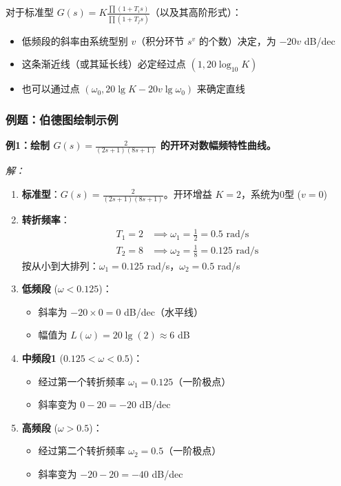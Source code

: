 对于标准型 $G(s) = K \frac{\prod(1+T_i s)}{\prod(1+T_j s)}$（以及其高阶形式）：
\begin{itemize}
    \item 低频段的斜率由系统型别 $v$（积分环节 $s^v$ 的个数）决定，为 $-20v$ dB/dec
    \item 这条渐近线（或其延长线）必定经过点 $(1, 20\log_{10}K)$
    \item 也可以通过点 $(\omega_0, 20\lg K - 20v\lg\omega_0)$ 来确定直线
\end{itemize}

\subsubsection{例题：伯德图绘制示例}

\textbf{例1：绘制 $G(s) = \frac{2}{(2s+1)(8s+1)}$ 的开环对数幅频特性曲线。}

\textit{解：}
\begin{enumerate}
    \item \textbf{标准型}：$G(s) = \frac{2}{(2s+1)(8s+1)}$。开环增益 $K=2$，系统为0型 ($v=0$)
    
    \item \textbf{转折频率}：
    \begin{align*}
    T_1=2 &\implies \omega_1=\frac{1}{2}=0.5 \text{ rad/s} \\
    T_2=8 &\implies \omega_2=\frac{1}{8}=0.125 \text{ rad/s}
    \end{align*}
    按从小到大排列：$\omega_1 = 0.125$ rad/s，$\omega_2 = 0.5$ rad/s
    
    \item \textbf{低频段} ($\omega < 0.125$)：
    \begin{itemize}
        \item 斜率为 $-20 \times 0 = 0$ dB/dec（水平线）
        \item 幅值为 $L(\omega) = 20\lg(2) \approx 6$ dB
    \end{itemize}
    
    \item \textbf{中频段1} ($0.125 < \omega < 0.5$)：
    \begin{itemize}
        \item 经过第一个转折频率 $\omega_1 = 0.125$（一阶极点）
        \item 斜率变为 $0 - 20 = -20$ dB/dec
    \end{itemize}
    
    \item \textbf{高频段} ($\omega > 0.5$)：
    \begin{itemize}
        \item 经过第二个转折频率 $\omega_2 = 0.5$（一阶极点）
        \item 斜率变为 $-20 - 20 = -40$ dB/dec
    \end{itemize}
\end{enumerate}

